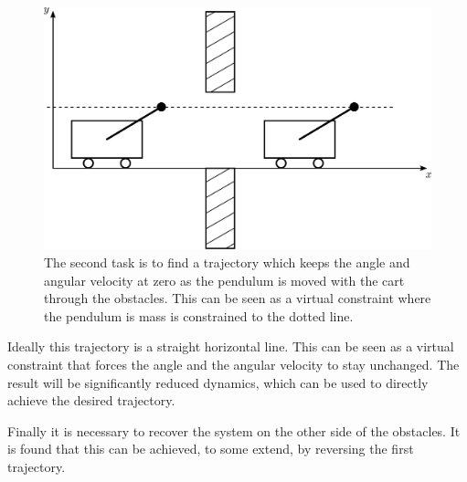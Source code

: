 \begin{figure}[H]
  \includegraphics[width=.5\textwidth]{figures/secondTask}
  \caption{The second task is to find a trajectory which keeps the angle and angular velocity at zero as the pendulum is moved with the cart through the obstacles. This can be seen as a virtual constraint where the pendulum is mass is constrained to the dotted line.}
  \label{fig:secondTask}
\end{figure}

Ideally this trajectory is a straight horizontal line. This can be seen as a virtual constraint that forces the angle and the angular velocity to stay unchanged. The result will be significantly reduced dynamics, which can be used to directly achieve the desired trajectory.

Finally it is necessary to recover the system on the other side of the obstacles. It is found that this can be achieved, to some extend, by reversing the first trajectory.